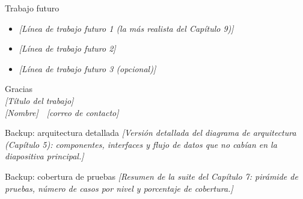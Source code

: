 \documentclass[11pt, aspectratio=169]{beamer}
\newcommand{\ph}[1]{\texorpdfstring{\textcolor{grisplaceholder}{\textit{[#1]}}}{[#1]}}
\newcounter{framefinal}
\newcommand{\backupbegin}{\setcounter{framefinal}{\value{framenumber}}}
\begin{document}
\begin{frame}{Trabajo futuro}
  \begin{itemize}
    \item \ph{Línea de trabajo futuro 1 (la más realista del Capítulo 9)}
    \item \ph{Línea de trabajo futuro 2}
    \item \ph{Línea de trabajo futuro 3 (opcional)}
  \end{itemize}
\end{frame}

\begin{frame}[plain]
  \begin{center}
    {Gracias}\\[2ex]
    \ph{Título del trabajo}\\[1ex]
    \ph{Nombre} \,\textperiodcentered\, \ph{correo de contacto}
  \end{center}
\end{frame}

\appendix
\backupbegin

\begin{frame}{Backup: arquitectura detallada}
  \ph{Versión detallada del diagrama de arquitectura (Capítulo 5):
  componentes, interfaces y flujo de datos que no cabían en la
  diapositiva principal.}
\end{frame}

\begin{frame}{Backup: cobertura de pruebas}
  \ph{Resumen de la suite del Capítulo 7: pirámide de pruebas, número
  de casos por nivel y porcentaje de cobertura.}
\end{frame}
\end{document}
